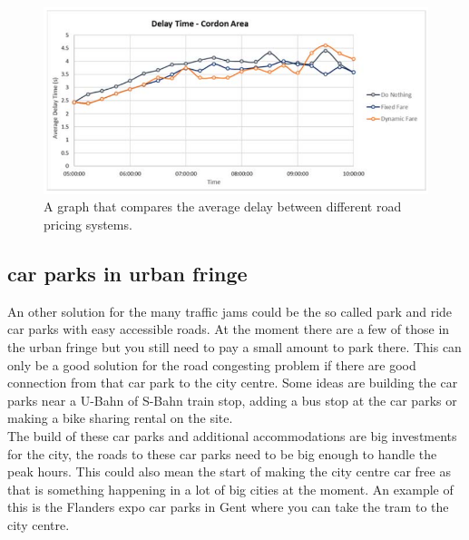 \begin{figure}[h!]
	\centering
	\includegraphics[width=0.55\textheight]{ProblemsFigures/dynamicRoadPricing}
	\caption{A graph that compares the average delay between different road pricing systems. }
	\label{fig:dynroad}
\end{figure}

\subsection{car parks in urban fringe} \label{subsec:parkin}
An other solution for the many traffic jams could be the so called park and ride car parks with easy accessible roads. At the moment there are a few of those in the urban fringe but you still need to pay a small amount to park there. This can only be a good solution for the road congesting problem if there are good connection from that car park to the city centre. Some ideas are building the car parks near a U-Bahn of S-Bahn train stop, adding a bus stop at the car parks or making a bike sharing rental on the site. \\ \newline 
The build of these car parks and additional accommodations are big investments for the city, the roads to these car parks need to be big enough to handle the peak hours. This could also mean the start of making the city centre car free as that is something happening in a lot of big cities at the moment. An example of this is the Flanders expo car parks in Gent where you can take the tram to the city centre. 

